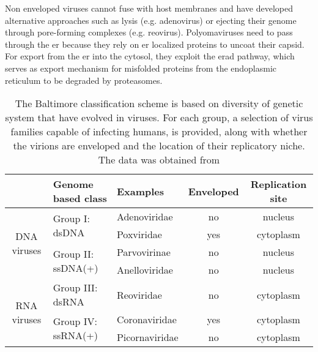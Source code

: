 
Non enveloped viruses cannot fuse with host membranes and have developed alternative approaches such as lysis (e.g. adenovirus) or ejecting their genome through pore-forming complexes (e.g. reovirus). Polyomaviruses need to pass through the \gls{er} because they rely on \gls{er} localized proteins to uncoat their capsid. For export from the \gls{er} into the cytosol, they exploit the \gls{erad} pathway, which serves as export mechanism for misfolded proteins from the endoplasmic reticulum to be degraded by proteasomes.

\renewcommand{\arraystretch}{1.5}

\begin{table}
  \label{tab:baltimore-classification}
  \centering
  \caption[The Baltimore classification scheme for viruses]{The Baltimore classification scheme is based on diversity of genetic system that have evolved in viruses. For each group, a selection of virus families capable of infecting humans, is provided, along with whether the virions are enveloped and the location of their replicatory niche. The data was obtained from \cite{Hulo2011}}
  \footnotesize
  \begin{tabular}{c|l|l|c|c}
    & Genome based class & Examples & Enveloped & Replication site \\
    \hline \multirow{4}{*}{\begin{sideways}DNA viruses\end{sideways}} &
    \multirow{2}{*}{Group I: dsDNA} &
    Adenoviridae &
    no & nucleus \\
    \cline{3-5} &
    & Poxviridae &
    yes & cytoplasm \\
    \cline{2-5} &
    \multirow{2}{*}{Group II: ssDNA(+)} &
    Parvovirinae &
    no & nucleus \\
    \cline{3-5} &
    & Anelloviridae &
    no & nucleus \\
    \hline \multirow{6}{*}{\begin{sideways}RNA viruses\end{sideways}} &   
    Group III: dsRNA &
    Reoviridae &
    no & cytoplasm \\
    \cline{2-5} &
    \multirow{3}{*}{Group IV: ssRNA(+)} &
    Coronaviridae &
    yes & cytoplasm \\
    \cline{3-5} &
    & Picornaviridae &
    no & cytoplasm \\

\end{tabular}
\end{table}
